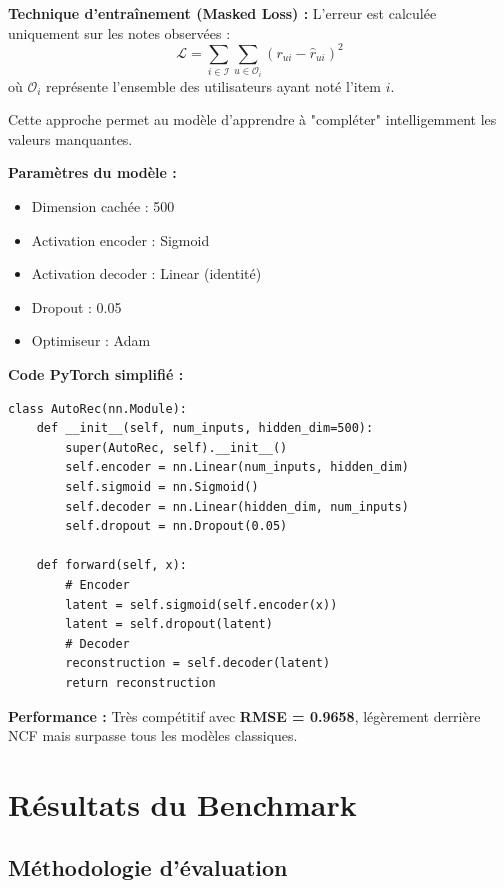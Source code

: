 \documentclass[12pt,a4paper]{article}
\begin{document}
\textbf{Technique d'entraînement (Masked Loss) :}
L'erreur est calculée uniquement sur les notes observées :
\begin{equation}
    \mathcal{L} = \sum_{i \in \mathcal{I}} \sum_{u \in \mathcal{O}_i} (r_{ui} - \hat{r}_{ui})^2
\end{equation}
où $\mathcal{O}_i$ représente l'ensemble des utilisateurs ayant noté l'item $i$.

Cette approche permet au modèle d'apprendre à "compléter" intelligemment les valeurs manquantes.

\textbf{Paramètres du modèle :}
\begin{itemize}
    \item Dimension cachée : 500
    \item Activation encoder : Sigmoid
    \item Activation decoder : Linear (identité)
    \item Dropout : 0.05
    \item Optimiseur : Adam
\end{itemize}

\textbf{Code PyTorch simplifié :}
\begin{lstlisting}[style=pythonstyle, caption=Architecture AutoRec (extrait)]
class AutoRec(nn.Module):
    def __init__(self, num_inputs, hidden_dim=500):
        super(AutoRec, self).__init__()
        self.encoder = nn.Linear(num_inputs, hidden_dim)
        self.sigmoid = nn.Sigmoid()
        self.decoder = nn.Linear(hidden_dim, num_inputs)
        self.dropout = nn.Dropout(0.05)
        
    def forward(self, x):
        # Encoder
        latent = self.sigmoid(self.encoder(x))
        latent = self.dropout(latent)
        # Decoder
        reconstruction = self.decoder(latent)
        return reconstruction
\end{lstlisting}

\textbf{Performance :} Très compétitif avec \textbf{RMSE = 0.9658}, légèrement derrière NCF mais surpasse tous les modèles classiques.

\section{Résultats du Benchmark}

\subsection{Méthodologie d'évaluation}
\end{document}

